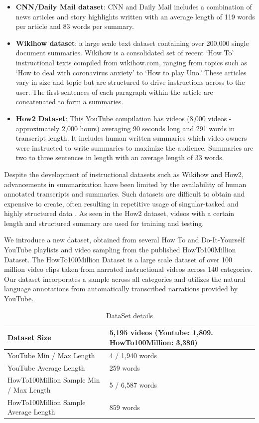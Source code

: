 \documentclass{article}
\begin{document}
\begin{itemize}

\item \textbf{CNN/Daily Mail dataset}: CNN and Daily Mail includes a combination of news articles and story highlights written with an average length of 119 words per article and 83 words per summary.
\item \textbf{Wikihow dataset}: a large scale text dataset containing over 200,000 single document summaries. Wikihow is a consolidated set of recent ‘How To’ instructional texts compiled from wikihow.com, ranging from topics such as ‘How to deal with coronavirus anxiety’ to ‘How to play Uno.’ These articles vary in size and topic but are structured to drive instructions across to the user. The first sentences of each paragraph within the article are concatenated to form a summaries. 
\item \textbf{How2 Dataset}:  This YouTube compilation has videos (8,000 videos - approximately 2,000 hours) averaging 90 seconds long and 291 words in transcript length. It includes human written summaries which video owners were instructed to write summaries to maximize the audience. Summaries are two to three sentences in length with an average length of 33 words. 

\end{itemize}

Despite the development of instructional datasets such as Wikihow and How2, advancements in summarization have been limited by the availability of human annotated transcripts and summaries. Such datasets are difficult to obtain and expensive to create, often resulting in repetitive usage of singular-tasked and highly structured data . As seen in the How2 dataset, videos with a certain length and structured summary are used for training and testing. 

We introduce a new dataset, obtained from several How To and Do-It-Yourself YouTube playlists and video sampling from the published HowTo100Million Dataset. The HowTo100Million Dataset is a large scale dataset of over 100 million video clips taken from narrated instructional videos across 140 categories. Our dataset incorporates a sample across all categories and utilizes the natural language annotations from automatically transcribed narrations provided by YouTube.

\begin{table}[H]
  \caption{DataSet details}
  \label{dataset}
  \centering
  \begin{tabular}{llll}
    \toprule
  Dataset Size  &  5,195 videos (Youtube: 1,809. HowTo100Million: 3,386)    \\
 \midrule   
   YouTube Min / Max Length  &  4 / 1,940 words     \\
\midrule
YouTube Average Length & 259 words    \\
\midrule
  HowTo100Million Sample Min / Max Length & 5 / 6,587 words    \\
\midrule
HowTo100Million Sample Average Length & 859 words   \\
\bottomrule
  \end{tabular}
\end{table}
\end{document}
